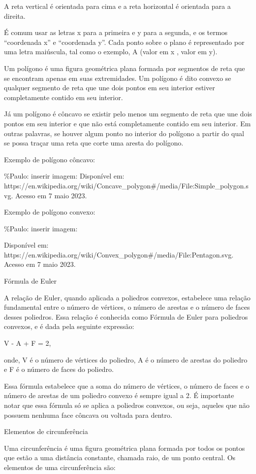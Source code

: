 A reta vertical é orientada para cima e a reta horizontal é orientada
para a direita.

É comum usar as letras x para a primeira e y para a segunda, e os termos
``coordenada x'' e ``coordenada y''. Cada ponto sobre o plano é
representado por uma letra maiúscula, tal como o exemplo, A (valor em x
, valor em y).

Um polígono é uma figura geométrica plana formada por segmentos de reta
que se encontram apenas em suas extremidades. Um polígono é dito convexo
se qualquer segmento de reta que une dois pontos em seu interior estiver
completamente contido em seu interior.

Já um polígono é côncavo se existir pelo menos um segmento de reta que
une dois pontos em seu interior e que não está completamente contido em
seu interior. Em outras palavras, se houver algum ponto no interior do
polígono a partir do qual se possa traçar uma reta que corte uma aresta
do polígono.

Exemplo de polígono côncavo:

\%Paulo: inserir imagem: Disponível em:
https://en.wikipedia.org/wiki/Concave\_polygon\#/media/File:Simple\_polygon.svg.
Acesso em 7 maio 2023.

Exemplo de polígono convexo:

\%Paulo: inserir imagem:

Disponível em:
https://en.wikipedia.org/wiki/Convex\_polygon\#/media/File:Pentagon.svg.
Acesso em 7 maio 2023.

Fórmula de Euler

A relação de Euler, quando aplicada a poliedros convexos, estabelece uma
relação fundamental entre o número de vértices, o número de arestas e o
número de faces desses poliedros. Essa relação é conhecida como Fórmula
de Euler para poliedros convexos, e é dada pela seguinte expressão:

V - A + F = 2,

onde, V é o número de vértices do poliedro, A é o número de arestas do
poliedro e F é o número de faces do poliedro.

Essa fórmula estabelece que a soma do número de vértices, o número de
faces e o número de arestas de um poliedro convexo é sempre igual a 2. É
importante notar que essa fórmula só se aplica a poliedros convexos, ou
seja, aqueles que não possuem nenhuma face côncava ou voltada para
dentro.

Elementos de circunferência

Uma circunferência é uma figura geométrica plana formada por todos os
pontos que estão a uma distância constante, chamada raio, de um ponto
central. Os elementos de uma circunferência são:

